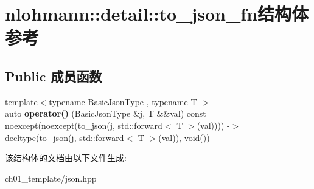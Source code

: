 \hypertarget{structnlohmann_1_1detail_1_1to__json__fn}{}\section{nlohmann\+::detail\+::to\+\_\+json\+\_\+fn结构体 参考}
\label{structnlohmann_1_1detail_1_1to__json__fn}
\subsection*{Public 成员函数}
\begin{DoxyCompactItemize}
\item 
\mbox{\label{structnlohmann_1_1detail_1_1to__json__fn_aecfb5114c8a737fc89d98589482795b8}} 
{\footnotesize template$<$typename Basic\+Json\+Type , typename T $>$ }\\auto {\bfseries operator()} (Basic\+Json\+Type \&j, T \&\&val) const noexcept(noexcept(to\+\_\+json(j, std\+::forward$<$ T $>$(val)))) -\/$>$ decltype(to\+\_\+json(j, std\+::forward$<$ T $>$(val)), void())
\end{DoxyCompactItemize}


该结构体的文档由以下文件生成\+:\begin{DoxyCompactItemize}
\item 
ch01\+\_\+template/json.\+hpp\end{DoxyCompactItemize}

